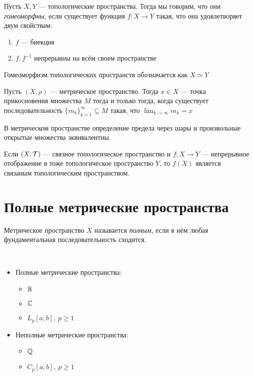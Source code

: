 \begin{definition}
	Пусть $X, Y$ --- топологические пространства. Тогда мы говорим, что они \textit{гомеоморфны}, если существует функция $f \colon X \to Y$ такая, что она удовлетворяет двум свойствам:
	\begin{enumerate}
		\item $f$ --- биекция
		
		\item $f, f^{-1}$ непрерывны на всём своем пространстве
	\end{enumerate}
	Гомеоморфизм топологических пространств обозначается как $X \simeq Y$
\end{definition}

\begin{exercise}
	Пусть $(X, \rho)$ --- метрическое пространство. Тогда $x \in X$ --- точка прикосновения множества $M$ тогда и только тогда, когда существует последовательность $\{m_k\}_{k = 1}^\infty \subseteq M$ такая, что $\lim_{k \to \infty} m_k = x$
\end{exercise}

\begin{exercise}
	В метрическом пространстве определение предела через шары и произвольные открытые множества эквивалентны.
\end{exercise}

\begin{exercise}
	Если $(X, \mathcal{T})$ --- связное топологическое пространство и $f \colon X \to Y$ --- непрерывное отображение в тоже топологическое пространство $Y$, то $f(X)$ является связаным топологическим пространством.
\end{exercise}
 
\section{Полные метрические пространства}

\begin{definition}
	Метрическое пространство $X$ называется \textit{полным}, если в нём любая фундаментальная последовательность сходится.
\end{definition}

\begin{example}~
	\begin{itemize}
		\item Полные метрические пространства:
		\begin{itemize}
			\item $\mathbb{R}$
			
			\item $\mathbb{C}$
			
			\item $L_p[a; b],\ p \ge 1$
		\end{itemize}
		
		\item Неполные метрические пространства:
		\begin{itemize}
			\item $\mathbb{Q}$
			
			\item $C_p[a; b],\ p \ge 1$
		\end{itemize}
	\end{itemize}
\end{example}

